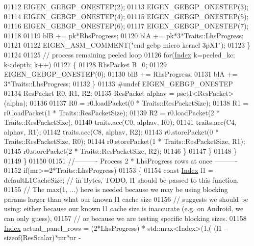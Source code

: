 \begin{DoxyCode}
01112             EIGEN\_GEBGP\_ONESTEP(2);
01113             EIGEN\_GEBGP\_ONESTEP(3);
01114             EIGEN\_GEBGP\_ONESTEP(4);
01115             EIGEN\_GEBGP\_ONESTEP(5);
01116             EIGEN\_GEBGP\_ONESTEP(6);
01117             EIGEN\_GEBGP\_ONESTEP(7);
01118 
01119             blB += pk*RhsProgress;
01120             blA += pk*3*Traits::LhsProgress;
01121 
01122             EIGEN\_ASM\_COMMENT(\textcolor{stringliteral}{"end gebp micro kernel 3pX1"});
01123           \}
01124 
01125           \textcolor{comment}{// process remaining peeled loop}
01126           \textcolor{keywordflow}{for}(\hyperlink{namespace_eigen_a62e77e0933482dafde8fe197d9a2cfde}{Index} k=peeled\_kc; k<depth; k++)
01127           \{
01128             RhsPacket B\_0;
01129             EIGEN\_GEBGP\_ONESTEP(0);
01130             blB += RhsProgress;
01131             blA += 3*Traits::LhsProgress;
01132           \}
01133 \textcolor{preprocessor}{#undef EIGEN\_GEBGP\_ONESTEP}
01134           ResPacket R0, R1, R2;
01135           ResPacket alphav = pset1<ResPacket>(alpha);
01136 
01137           R0 = r0.loadPacket(0 * Traits::ResPacketSize);
01138           R1 = r0.loadPacket(1 * Traits::ResPacketSize);
01139           R2 = r0.loadPacket(2 * Traits::ResPacketSize);
01140           traits.acc(C0, alphav, R0);
01141           traits.acc(C4, alphav, R1);
01142           traits.acc(C8, alphav, R2);
01143           r0.storePacket(0 * Traits::ResPacketSize, R0);
01144           r0.storePacket(1 * Traits::ResPacketSize, R1);
01145           r0.storePacket(2 * Traits::ResPacketSize, R2);          
01146           \}
01147         \}
01148       \}
01149     \}
01150 
01151     \textcolor{comment}{//---------- Process 2 * LhsProgress rows at once ----------}
01152     \textcolor{keywordflow}{if}(mr>=2*Traits::LhsProgress)
01153     \{
01154       \textcolor{keyword}{const} \hyperlink{namespace_eigen_a62e77e0933482dafde8fe197d9a2cfde}{Index} l1 = defaultL1CacheSize; \textcolor{comment}{// in Bytes, TODO, l1 should be passed to this function.}
01155       \textcolor{comment}{// The max(1, ...) here is needed because we may be using blocking params larger than what our known
       l1 cache size}
01156       \textcolor{comment}{// suggests we should be using: either because our known l1 cache size is inaccurate (e.g. on
       Android, we can only guess),}
01157       \textcolor{comment}{// or because we are testing specific blocking sizes.}
01158       \hyperlink{namespace_eigen_a62e77e0933482dafde8fe197d9a2cfde}{Index} actual\_panel\_rows = (2*LhsProgress) * std::max<Index>(1,( (l1 - \textcolor{keyword}{sizeof}(ResScalar)*mr*nr - 

\end{DoxyCode}
